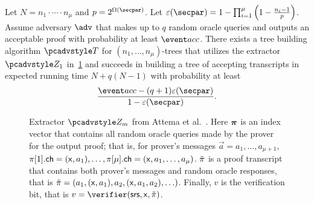   \begin{lemma}\label{lem:attema}
	Let $N = n_1 \cdot \cdots \cdot n_\mu$ and $p = 2^{\Omega(\secpar)}$. Let $\eps(\secpar) = 1 - \prod_{i=1}^{\mu}\left(1 - \frac{n_i - 1}{p}\right)$.
	Assume adversary $\adv$ that makes up to $q$ random
	oracle queries and outputs an acceptable proof with probability at least
	$\accProb$. There exists a tree building algorithm $\tdv$ for $(n_1, \ldots, n_\mu)$-trees that utilizes the extractor $\zdv_1$ in~\cref{fig:Attema-ext} and succeeds in building a
	tree of accepting transcripts in expected
	running time $N + q (N - 1)$ with probability at least
	\[
	\frac{\accProb - (q + 1) \eps (\secpar)}{1 - \eps (\secpar)}.
	\]
	\end{lemma}

\begin{figure}[t]
	\centering
	\caption{Extractor $\zdv_m$ from Attema et al.~\cite{EPRINT:AttFehKlo21}. Here $\vec{\zkproof}$ is an index vector that contains all random oracle queries made by the prover for the output proof; that is, for prover's messages $\vec{a} = a_1, \ldots, a_{\mu + 1}$, $\pi[1].\mathsf{ch} = (\mathsf{x}, a_1), \ldots, \pi[{\mu}].\mathsf{ch} = (\mathsf{x}, a_1, \ldots, a_\mu)$.  $\tilde{\pi}$ is a proof transcript that contains both prover's messages and random oracle responses, that is $\tilde{\pi} = (a_1, (\mathsf{x}, a_1), a_2, (\mathsf{x}, a_1, a_2), \ldots)$. Finally, $v$ is the verification bit, that is $v = \verifier (\srs, \inp, \tzkproof)$. }
	\label{fig:Attema-ext}
\end{figure} 